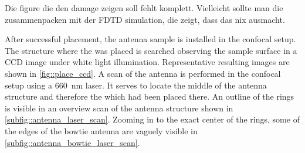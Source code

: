 			\begin{remark}
				Die figure die den damage zeigen soll fehlt komplett. Vielleicht sollte man die zusammenpacken mit der FDTD simulation, die zeigt, dass das nix ausmacht.
			\end{remark}

			After successful placement, the antenna sample is installed in the confocal setup.
			The structure where the \nd was placed is searched observing the sample surface in a CCD image under white light illumination. Representative resulting images are shown in \autoref{fig::place_ccd}.
			A scan of the antenna is performed in the confocal setup using a \SI{660}{nm} \cw laser.
			It serves to locate the middle of the antenna structure and therefore the \nd which had been placed there.
			An outline of the rings is visible in an overview scan of the antenna structure shown in \autoref{subfig::antenna_laser_scan}.
			Zooming in to the exact center of the rings, some of the edges of the bowtie antenna are vaguely visible in \autoref{subfig::antenna_bowtie_laser_scan}.

